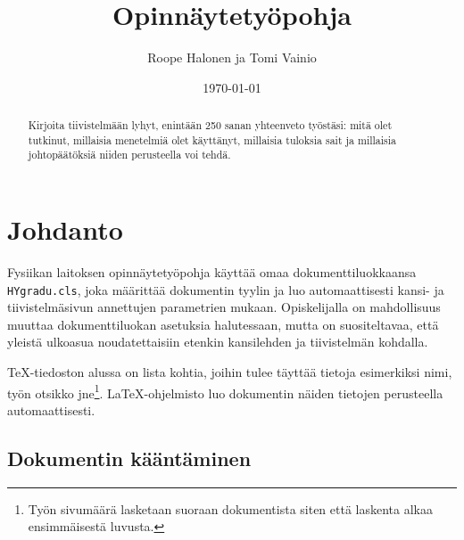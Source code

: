 \documentclass[finnish,twoside,openright]{HYgradu}
\title{Opinn\"aytety\"opohja}
\author{Roope Halonen ja Tomi Vainio}
\date{\today}
\begin{document}
\maketitle


\begin{abstract}
Kirjoita tiivistelm\"a\"an lyhyt, enint\"a\"an 250 sanan yhteenveto ty\"ost\"asi: mit\"a olet tutkinut, millaisia menetelmi\"a olet k\"aytt\"anyt, millaisia tuloksia sait ja millaisia johtop\"a\"at\"oksi\"a niiden perusteella voi tehd\"a.
\end{abstract}

\mytableofcontents

\mynomenclature

\chapter{Johdanto}

Fysiikan laitoksen opinn\"aytety\"opohja k\"aytt\"a\"a omaa dokumenttiluokkaansa \texttt{HYgradu.cls}, joka m\"a\"aritt\"a\"a dokumentin tyylin ja luo automaattisesti kansi- ja tiivistelm\"asivun annettujen parametrien mukaan. Opiskelijalla on mahdollisuus muuttaa dokumenttiluokan asetuksia halutessaan, mutta on suositeltavaa, ett\"a yleist\"a ulkoasua noudatettaisiin etenkin kansilehden ja tiivistelm\"an kohdalla.

\TeX-tiedoston alussa on lista kohtia, joihin tulee t\"aytt\"a\"a tietoja esimerkiksi nimi, ty\"on otsikko jne\footnote{Ty\"on sivum\"a\"ar\"a lasketaan suoraan dokumentista siten ett\"a laskenta alkaa ensimm\"aisest\"a luvusta.}. \LaTeX-ohjelmisto luo dokumentin n\"aiden tietojen perusteella automaattisesti.

\section{Dokumentin k\"a\"ant\"aminen}
\label{sec:compile}
\end{document}

